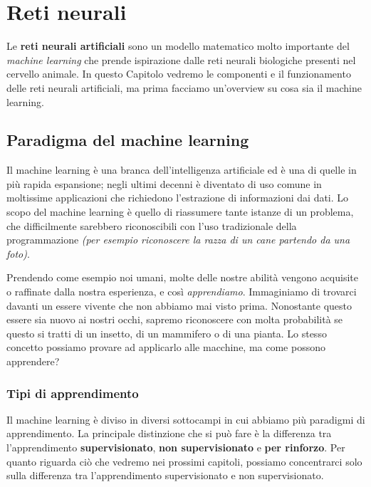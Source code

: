 \documentclass[12pt, twoside, letterpaper]{report}
\begin{document}
	\chapter{Reti neurali}
		Le \textbf{reti neurali artificiali} sono un modello matematico molto importante del \textit{machine learning} che prende ispirazione dalle reti neurali biologiche presenti nel cervello animale. In questo Capitolo vedremo le componenti e il funzionamento delle reti neurali artificiali, ma prima facciamo un'overview su cosa sia il machine learning.

		\section{Paradigma del machine learning}
			Il machine learning è una branca dell'intelligenza artificiale ed è una di quelle in più rapida espansione; negli ultimi decenni è diventato di uso comune in moltissime applicazioni che richiedono l'estrazione di informazioni dai dati. Lo scopo del machine learning è quello di riassumere tante istanze di un problema, che difficilmente sarebbero riconoscibili con l'uso tradizionale della programmazione \textit{(per esempio riconoscere la razza di un cane partendo da una foto)}.   
			
			Prendendo come esempio noi umani, molte delle nostre abilità vengono acquisite o raffinate dalla nostra esperienza, e così \textit{apprendiamo}. Immaginiamo di trovarci davanti un essere vivente che non abbiamo mai visto prima. Nonostante questo essere sia nuovo ai nostri occhi, sapremo riconoscere con molta probabilità se questo si tratti di un insetto, di un mammifero o di una pianta. Lo stesso concetto possiamo provare ad applicarlo alle macchine, ma come possono apprendere? 
			
			\subsection{Tipi di apprendimento} Il machine learning è diviso in diversi sottocampi in cui abbiamo più paradigmi di apprendimento. La principale distinzione che si può fare è la differenza tra l'apprendimento \textbf{supervisionato}, \textbf{non supervisionato} e \textbf{per rinforzo}. Per quanto riguarda ciò che vedremo nei prossimi capitoli, possiamo concentrarci solo sulla differenza tra l'apprendimento supervisionato e non supervisionato.
			
\end{document}

